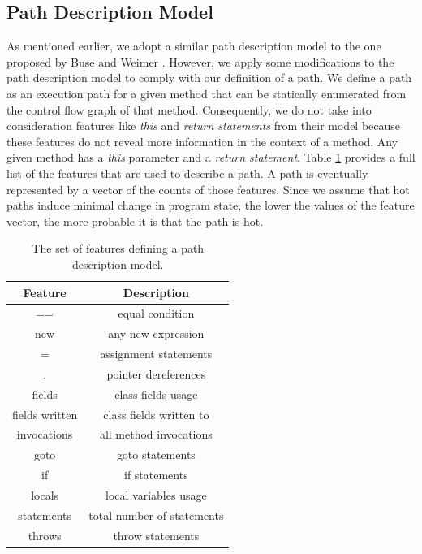 \documentclass[10pt,twocolumn,letterpaper]{article}
\begin{document}
\subsection{Path Description Model}
As mentioned earlier, we adopt a similar path description model to the one proposed by Buse and Weimer \cite{buse2009road}. However, we apply some modifications
to the path description model to comply with our definition of a path. We define a path as an execution path for a given method that can be statically
enumerated from the control flow graph of that method. Consequently, we do not take into consideration features like \textit{this} and \textit{return
statements} from their model \cite{buse2009road} because these features do not reveal more information in the context of a method. Any given method has a
\textit{this} parameter and a \textit{return statement}. Table \ref{tab:features} provides a full list of the features that are used to describe a path. A
path is eventually represented by a vector of the counts of those features. Since we assume that hot paths induce minimal change in program state, the lower the
values of the feature vector, the more probable it is that the path is hot.

\begin{table}[t!]
\centering
\begin{tabular}{|c|c|}
\hline
\textbf{Feature} & \textbf{Description}\\
\hline\hline
== & equal condition \\
\hline
new & any new expression \\
\hline
= & assignment statements \\
\hline
. & pointer dereferences \\
\hline
fields & class fields usage  \\
\hline
fields written & class fields written to \\
\hline
invocations & all method invocations \\
\hline
goto & goto statements \\
\hline
if & if statements \\
\hline
locals & local variables usage \\
\hline
statements & total number of statements \\
\hline
throws & throw statements \\
\hline
\end{tabular}
\centering
\caption{The set of features defining a path description model.}
\label{tab:features}
\end{table}
\end{document}
